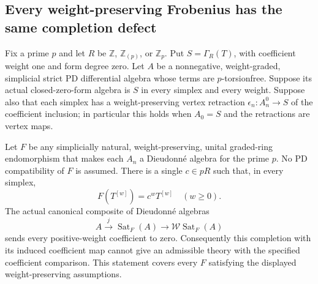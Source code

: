 \subsection{Every weight-preserving Frobenius has the same completion defect}

\begin{proposition}
\label{AWF02}
Fix a prime $p$ and let $R$ be $\mathbb Z$,
$\mathbb Z_{(p)}$, or $\mathbb Z_p$.
Put $S=\Gamma_R(T)$, with coefficient weight one
and form degree zero. Let $A$ be a nonnegative,
weight-graded, simplicial strict PD differential
algebra whose terms are $p$-torsionfree. Suppose
its actual closed-zero-form algebra is $S$ in
every simplex and every weight. Suppose also that
each simplex has a weight-preserving vertex
retraction $\epsilon_n:A_n^0\to S$ of the
coefficient inclusion; in particular this holds
when $A_0=S$ and the retractions are vertex maps.

Let $F$ be any simplicially natural, weight-preserving,
unital graded-ring endomorphism that makes each
$A_n$ a Dieudonn\'e algebra for the prime $p$.
No PD compatibility of $F$ is assumed.
There is a single $c\in pR$ such that, in every
simplex,
\[
                    F(T^{[w]})=c^w T^{[w]}
                    \quad(w\geq0).
 \tag{WF.9}
\]
The actual canonical composite of Dieudonn\'e
algebras
\[
 A\xrightarrow{\ j\ }\operatorname{Sat}_F(A)
     \longrightarrow\mathcal W\operatorname{Sat}_F(A)
 \tag{WF.10}
\]
sends every positive-weight coefficient to zero.
Consequently this completion with its induced
coefficient map cannot give an admissible theory
with the specified coefficient comparison.
This statement covers every $F$ satisfying the
displayed weight-preserving assumptions.
\end{proposition}

